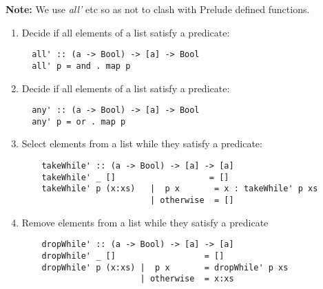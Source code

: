 \documentclass{article}
\begin{document}
\begin{Answer}
  \textbf{Note:} We use \textit{all'} etc so as not to clash with Prelude defined functions. 
  \begin{enumerate}
    \item Decide if all elements of a list satisfy a predicate:
  \begin{lstlisting}
  all' :: (a -> Bool) -> [a] -> Bool
  all' p = and . map p 
  \end{lstlisting}
    \item Decide if all elements of a list satisfy a predicate:
  \begin{lstlisting}
  any' :: (a -> Bool) -> [a] -> Bool
  any' p = or . map p
  \end{lstlisting}
    \item Select elements from a list while they satisfy a predicate:
  \begin{lstlisting}
    takeWhile' :: (a -> Bool) -> [a] -> [a]
    takeWhile' _ []                   = []
    takeWhile' p (x:xs)   |  p x       = x : takeWhile' p xs
                          | otherwise  = []
    \end{lstlisting}
    \item Remove elements from a list while they satisfy a predicate
  \begin{lstlisting}
    dropWhile' :: (a -> Bool) -> [a] -> [a]
    dropWhile' _ []                  = []
    dropWhile' p (x:xs) |  p x       = dropWhile' p xs
                        | otherwise  = x:xs
  \end{lstlisting}
  \end{enumerate}
\end{Answer}
\end{document}
